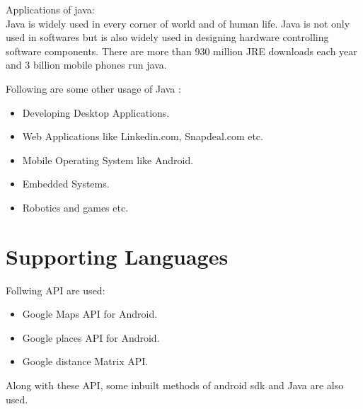 Applications of java:\\
Java is widely used in every corner of world and of human life. Java is not only used in softwares but is also widely used in designing hardware controlling software components. There are more than 930 million JRE downloads each year and 3 billion mobile phones run java.

Following are some other usage of Java :
\begin{itemize}
	\item Developing Desktop Applications.
	\item Web Applications like Linkedin.com, Snapdeal.com etc.
    \item	Mobile Operating System like Android.
    \item	Embedded Systems.
	\item Robotics and games etc.
\end{itemize}

\section{Supporting Languages}
Follwing API are used:
\begin{itemize}
	\item Google Maps API for Android.
	\item Google places API for Android.
	\item Google distance Matrix API.
\end{itemize}
Along with these API, some inbuilt methods of android sdk and Java are also used.
